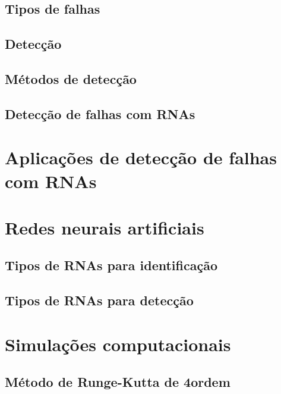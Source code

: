 \subsection{Tipos de falhas}

\subsection{Detecção}

\subsection{Métodos de detecção}

\subsection{Detecção de falhas com RNAs}

\section{Aplicações de detecção de falhas com RNAs}

\section{Redes neurais artificiais}

\subsection{Tipos de RNAs para identificação}

\subsection{Tipos de RNAs para detecção}

\section{Simulações computacionais}

\subsection{Método de Runge-Kutta de 4\textordfeminine ordem}
